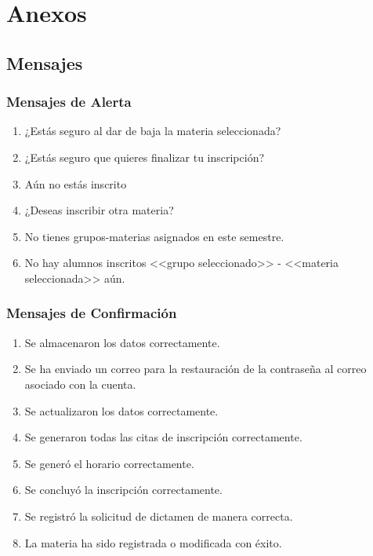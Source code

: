 \newpage
{}
\chapter*{Anexos}
\section*{Mensajes}
\subsection*{Mensajes de Alerta}
\begin{enumerate}[{MA} 1.]
\item ¿Estás seguro al dar de baja la materia seleccionada?
\item ¿Estás seguro que quieres finalizar tu inscripción?
\item Aún no estás inscrito
\item ¿Deseas inscribir otra materia?
\item No tienes grupos-materias asignados en este semestre.
\item No hay alumnos inscritos <<grupo seleccionado>> - <<materia seleccionada>> aún.
\end{enumerate}
\subsection*{Mensajes de Confirmación}
\begin{enumerate} [{MC} 1.]
\item Se almacenaron los datos correctamente.
\item Se ha enviado un correo para la restauración de la contraseña al correo asociado con la cuenta.
\item Se actualizaron los datos correctamente.
\item Se generaron todas las citas de inscripción correctamente.
\item Se generó el horario correctamente.
\item Se concluyó la inscripción correctamente.
\item Se registró la solicitud de dictamen de manera correcta.
\item La materia ha sido registrada o modificada con éxito.
\end{enumerate}
\newpage
